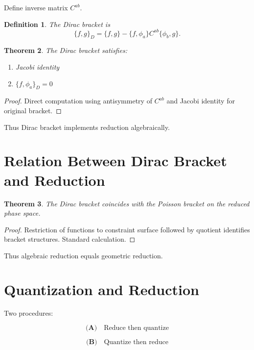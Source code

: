 \documentclass[11pt]{book}
\newtheorem{theorem}{Theorem}[chapter]
\newtheorem{definition}[theorem]{Definition}
\begin{document}
Define inverse matrix $C^{ab}$.

\begin{definition}
The Dirac bracket is
\[
\{f,g\}_D
=
\{f,g\}
-
\{f,\phi_a\}
C^{ab}
\{\phi_b,g\}.
\]
\end{definition}

\begin{theorem}
The Dirac bracket satisfies:
\begin{enumerate}
\item Jacobi identity
\item $\{f,\phi_a\}_D = 0$
\end{enumerate}
\end{theorem}

\begin{proof}
Direct computation using antisymmetry of $C^{ab}$
and Jacobi identity for original bracket.
\end{proof}

Thus Dirac bracket implements reduction algebraically.

\section{Relation Between Dirac Bracket and Reduction}

\begin{theorem}
The Dirac bracket coincides with the Poisson bracket
on the reduced phase space.
\end{theorem}

\begin{proof}
Restriction of functions to constraint surface
followed by quotient identifies bracket structures.
Standard calculation.
\end{proof}

Thus algebraic reduction equals geometric reduction.

\section{Quantization and Reduction}

Two procedures:

\[
\textbf{(A)}\quad
\text{Reduce then quantize}
\]

\[
\textbf{(B)}\quad
\text{Quantize then reduce}
\]
\end{document}

